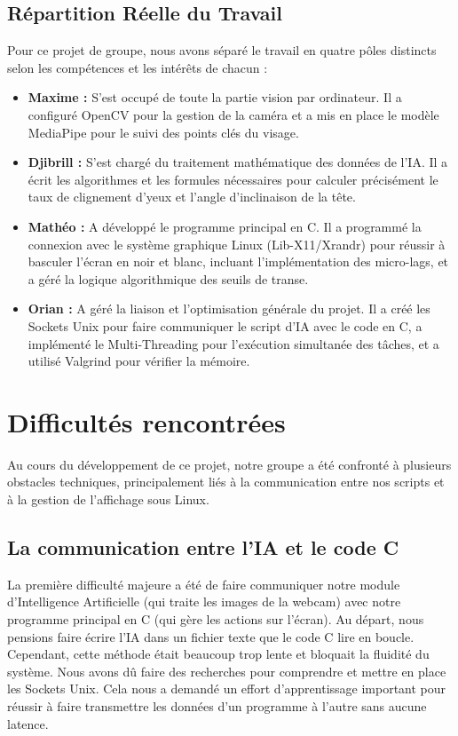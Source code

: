 \documentclass[a4paper, 12pt, twoside]{article}
\begin{document}
\subsection{Répartition Réelle du Travail}
Pour ce projet de groupe, nous avons séparé le travail en quatre pôles distincts selon les compétences et les intérêts de chacun :
\begin{itemize}
    \item \textbf{Maxime :} S'est occupé de toute la partie vision par ordinateur. Il a configuré OpenCV pour la gestion de la caméra et a mis en place le modèle MediaPipe pour le suivi des points clés du visage.
    \item \textbf{Djibrill :} S'est chargé du traitement mathématique des données de l'IA. Il a écrit les algorithmes et les formules nécessaires pour calculer précisément le taux de clignement d'yeux et l'angle d'inclinaison de la tête.
    \item \textbf{Mathéo :} A développé le programme principal en C. Il a programmé la connexion avec le système graphique Linux (Lib-X11/Xrandr) pour réussir à basculer l'écran en noir et blanc, incluant l'implémentation des micro-lags, et a géré la logique algorithmique des seuils de transe.
    \item \textbf{Orian :} A géré la liaison et l'optimisation générale du projet. Il a créé les Sockets Unix pour faire communiquer le script d'IA avec le code en C, a implémenté le Multi-Threading pour l'exécution simultanée des tâches, et a utilisé Valgrind pour vérifier la mémoire.
\end{itemize}

\newpage

\section{Difficultés rencontrées}
Au cours du développement de ce projet, notre groupe a été confronté à plusieurs obstacles techniques, principalement liés à la communication entre nos scripts et à la gestion de l'affichage sous Linux.

\subsection{La communication entre l'IA et le code C}
La première difficulté majeure a été de faire communiquer notre module d'Intelligence Artificielle (qui traite les images de la webcam) avec notre programme principal en C (qui gère les actions sur l'écran). Au départ, nous pensions faire écrire l'IA dans un fichier texte que le code C lire en boucle. Cependant, cette méthode était beaucoup trop lente et bloquait la fluidité du système. Nous avons dû faire des recherches pour comprendre et mettre en place les Sockets Unix. Cela nous a demandé un effort d'apprentissage important pour réussir à faire transmettre les données d'un programme à l'autre sans aucune latence.
\end{document}
